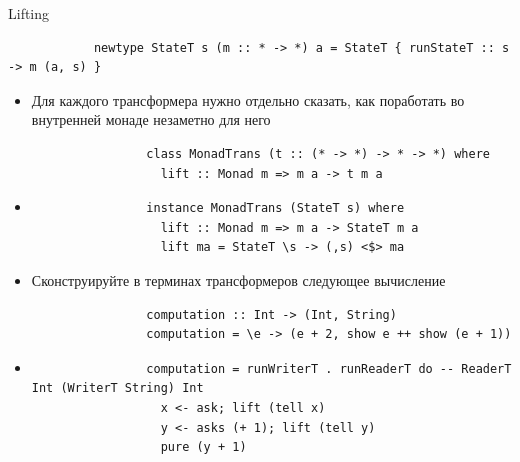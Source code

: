     \begin{frame}[fragile]{Lifting}
        \begin{verbatim}
            newtype StateT s (m :: * -> *) a = StateT { runStateT :: s -> m (a, s) }
        \end{verbatim}
        \begin{itemize}
            \item Для каждого трансформера нужно отдельно сказать, как поработать во внутренней монаде незаметно для него
            \begin{verbatim}
                class MonadTrans (t :: (* -> *) -> * -> *) where
                  lift :: Monad m => m a -> t m a
            \end{verbatim}
            \item[\eg]
            \begin{verbatim}
                instance MonadTrans (StateT s) where
                  lift :: Monad m => m a -> StateT m a
                  lift ma = StateT \s -> (,s) <$> ma
            \end{verbatim}
            \item[\todo] Сконструируйте в терминах трансформеров следующее вычисление
            \begin{verbatim}
                computation :: Int -> (Int, String)
                computation = \e -> (e + 2, show e ++ show (e + 1))
            \end{verbatim}
            \item[\answer] \pause
            \begin{verbatim}
                computation = runWriterT . runReaderT do -- ReaderT Int (WriterT String) Int
                  x <- ask; lift (tell x)
                  y <- asks (+ 1); lift (tell y)
                  pure (y + 1)
            \end{verbatim}
        \end{itemize}
    \end{frame}

